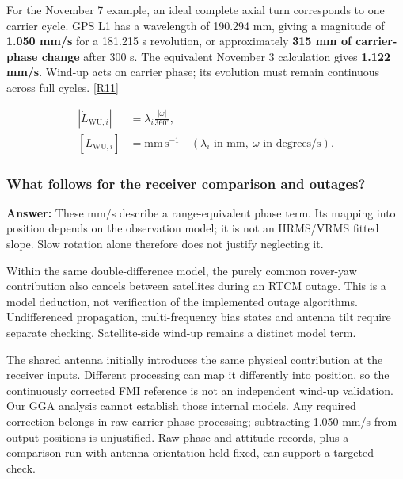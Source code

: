 \documentclass[11pt,a4paper]{article}
\numberwithin{equation}{section}
\numberwithin{figure}{section}
\begin{document}
For the November 7 example, an ideal complete axial turn corresponds to one carrier cycle. GPS L1 has a wavelength of 190.294 mm, giving a magnitude of \textbf{1.050 mm/\allowbreak{}s} for a 181.215 s revolution, or approximately \textbf{315 mm of carrier-phase change} after 300 s. The equivalent November 3 calculation gives \textbf{1.122 mm/\allowbreak{}s}. Wind-up acts on carrier phase; its evolution must remain continuous across full cycles. \hyperlink{ref-R11}{[R11]}

\begin{equation}\begin{aligned}\left|\dot L_{\mathrm{WU},i}\right|&=\lambda_i\frac{|\omega|}{360^{\circ}},\\ \left[\dot L_{\mathrm{WU},i}\right]&=\mathrm{mm\,s^{-1}}\quad(\lambda_i\text{ in mm},\ \omega\text{ in degrees/s}).\end{aligned}\label{eq:en-windup}\end{equation}

\subsubsection{What follows for the receiver comparison and outages?}

\textbf{Answer:} These mm/\allowbreak{}s describe a range-equivalent phase term. Its mapping into position depends on the observation model; it is not an HRMS/\allowbreak{}VRMS fitted slope. Slow rotation alone therefore does not justify neglecting it.

Within the same double-difference model, the purely common rover-yaw contribution also cancels between satellites during an RTCM outage. This is a model deduction, not verification of the implemented outage algorithms. Undifferenced propagation, multi-frequency bias states and antenna tilt require separate checking. Satellite-side wind-up remains a distinct model term.

The shared antenna initially introduces the same physical contribution at the receiver inputs. Different processing can map it differently into position, so the continuously corrected FMI reference is not an independent wind-up validation. Our GGA analysis cannot establish those internal models. Any required correction belongs in raw carrier-phase processing; subtracting 1.050 mm/\allowbreak{}s from output positions is unjustified. Raw phase and attitude records, plus a comparison run with antenna orientation held fixed, can support a targeted check.
\end{document}
